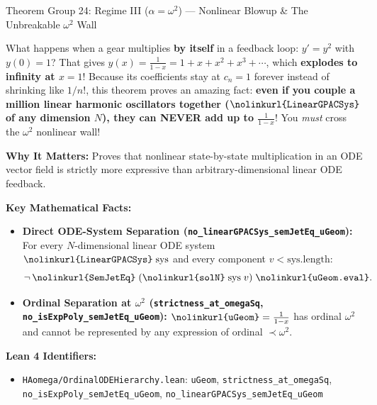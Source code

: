 \documentclass[11pt,a4paper]{article}
\newcommand{\lean}[1]{\texttt{\nolinkurl{#1}}}
\begin{document}
\vspace{6pt}

\begin{thmcard}{Theorem Group 24: Regime III (\texorpdfstring{$\alpha = \omega^2$}{alpha = omega\^2}) --- Nonlinear Blowup \& The Unbreakable \texorpdfstring{$\omega^2$}{omega\^2} Wall}
\begin{eli5box}
What happens when a gear multiplies \textbf{by itself} in a feedback loop: $y' = y^2$ with $y(0)=1$? That gives $y(x) = \frac{1}{1-x} = 1 + x + x^2 + x^3 + \cdots$, which \textbf{explodes to infinity at $x = 1$}! Because its coefficients stay at $c_n = 1$ forever instead of shrinking like $1/n!$, this theorem proves an amazing fact: \textbf{even if you couple a million linear harmonic oscillators together ($\lean{LinearGPACSys}$ of any dimension $N$), they can NEVER add up to $\frac{1}{1-x}$}! You \emph{must} cross the $\omega^2$ nonlinear wall!
\end{eli5box}

\textbf{Why It Matters:}
Proves that nonlinear state-by-state multiplication in an ODE vector field is strictly more expressive than arbitrary-dimensional linear ODE feedback.

\textbf{Key Mathematical Facts:}
\begin{itemize}
  \item \textbf{Direct ODE-System Separation (\lean{no_linearGPACSys_semJetEq_uGeom}):} For every $N$-dimensional linear ODE system $\lean{LinearGPACSys}\;\mathrm{sys}$ and every component $v < \mathrm{sys.length}$:
  \[
    \neg\,\lean{SemJetEq}\;(\lean{solN}\;\mathrm{sys}\;v)\;\lean{uGeom.eval}.
  \]
  \item \textbf{Ordinal Separation at $\omega^2$ (\lean{strictness_at_omegaSq}, \lean{no_isExpPoly_semJetEq_uGeom}):} $\lean{uGeom} = \frac{1}{1-x}$ has ordinal $\omega^2$ and cannot be represented by any expression of ordinal $\prec \omega^2$.
\end{itemize}

\textbf{Lean 4 Identifiers:}
\begin{itemize}
  \item \lean{HAomega/OrdinalODEHierarchy.lean}: \lean{uGeom}, \lean{strictness_at_omegaSq}, \lean{no_isExpPoly_semJetEq_uGeom}, \lean{no_linearGPACSys_semJetEq_uGeom}
\end{itemize}
\end{thmcard}

\vspace{6pt}
\end{document}
